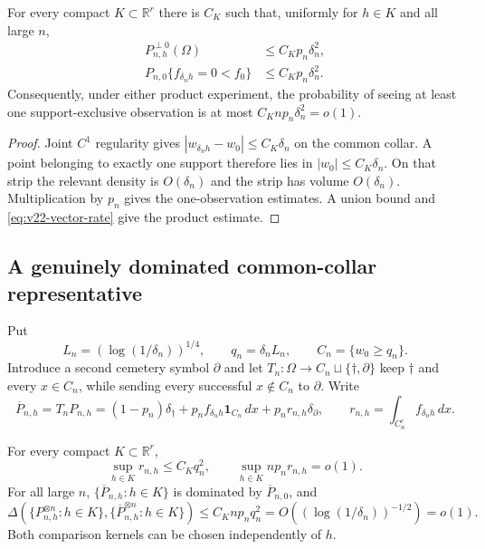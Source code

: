 \begin{lemma}
\label{lem:v22-support-decomposition}
For every compact $K\subset\mathbb R^r$ there is $C_K$ such that, uniformly
for $h\in K$ and all large $n$,
\begin{align}
 P_{n,h}^{\perp0}(\Omega)&\le C_Kp_n\delta_n^2,
                                      \label{eq:v22-alt-singular-mass}\\
 P_{n,0}\{f_{\delta_nh}=0<f_0\}&\le C_Kp_n\delta_n^2.
                                      \label{eq:v22-null-exclusive-mass}
\end{align}
Consequently, under either product experiment, the probability of seeing at
least one support-exclusive observation is at most
$C_Knp_n\delta_n^2=o(1)$.
\end{lemma}

\begin{proof}
Joint $C^1$ regularity gives
$|w_{\delta_nh}-w_0|\le C_K\delta_n$ on the common collar.  A point belonging
to exactly one support therefore lies in $|w_0|\le C_K\delta_n$.  On that
strip the relevant density is $O(\delta_n)$ and the strip has volume
$O(\delta_n)$.  Multiplication by $p_n$ gives the one-observation estimates.
A union bound and \eqref{eq:v22-vector-rate} give the product estimate.
\end{proof}

\subsection{A genuinely dominated common-collar representative}

Put
\begin{equation}\label{eq:v22-truncation-scale}
 L_n=(\log(1/\delta_n))^{1/4},\qquad
 q_n=\delta_nL_n,\qquad C_n=\{w_0\ge q_n\}.
\end{equation}
Introduce a second cemetery symbol $\partial$ and let
$T_n:\Omega\to C_n\sqcup\{\dagger,\partial\}$ keep $\dagger$ and every
$x\in C_n$, while sending every successful $x\notin C_n$ to $\partial$.
Write
\begin{equation}\label{eq:v22-censored-law}
 \overline P_{n,h}=T_nP_{n,h}
 =(1-p_n)\delta_\dagger
 +p_nf_{\delta_nh}\mathbf1_{C_n}\,dx
 +p_nr_{n,h}\delta_\partial,
 \qquad
 r_{n,h}=\int_{C_n^c}f_{\delta_nh}\,dx.
\end{equation}

\begin{lemma}
\label{lem:v22-common-collar-equivalence}
For every compact $K\subset\mathbb R^r$,
\begin{equation}\label{eq:v22-collar-mass}
 \sup_{h\in K}r_{n,h}\le C_Kq_n^2,
 \qquad
 \sup_{h\in K}np_nr_{n,h}=o(1).
\end{equation}
For all large $n$, $\{\overline P_{n,h}:h\in K\}$ is dominated by
$\overline P_{n,0}$, and
\begin{equation}\label{eq:v22-lecam-censoring}
 \Delta\!\left(
  \{P_{n,h}^{\otimes n}:h\in K\},
  \{\overline P_{n,h}^{\otimes n}:h\in K\}
 \right)
 \le C_Knp_nq_n^2
 =O((\log(1/\delta_n))^{-1/2})=o(1).
\end{equation}
Both comparison kernels can be chosen independently of $h$.
\end{lemma}

